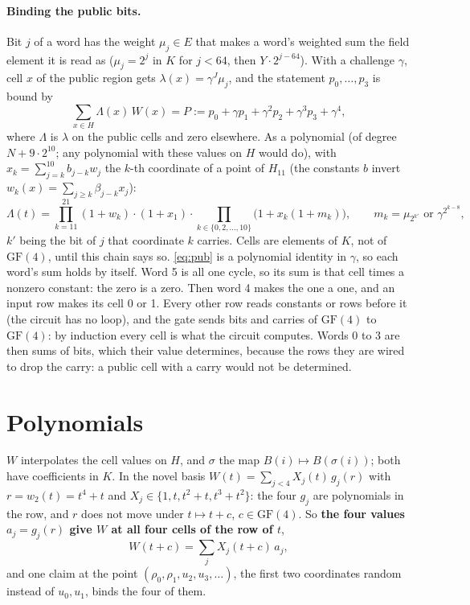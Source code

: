 \documentclass[11pt]{article}
\newcommand{\K}{K}
\newcommand{\E}{E}
\newcommand{\cells}{H}
\newcommand{\wit}{W}
\newcommand{\perm}{\sigma}
\newcommand{\pub}{\Lambda}
\newcommand{\target}{P}
\begin{document}
\paragraph{Binding the public bits.} Bit $j$ of a word has the weight $\mu_j \in \E$ that makes a word's weighted sum the field element it is read as ($\mu_j = 2^j$ in $\K$ for $j < 64$, then $Y \cdot 2^{j - 64}$). With a challenge $\gamma$, cell $x$ of the public region gets $\lambda(x) = \gamma^J \mu_j$, and the statement $p_0, \dots, p_3$ is bound by
\begin{equation}\label{eq:pub}
  \sum_{x \in \cells} \pub(x) \, \wit(x) = \target := p_0 + \gamma p_1 + \gamma^2 p_2 + \gamma^3 p_3 + \gamma^4 ,
\end{equation}
where $\pub$ is $\lambda$ on the public cells and zero elsewhere. As a polynomial (of degree $N + 9 \cdot 2^{10}$; any polynomial with these values on $\cells$ would do), with $x_k = \sum_{j = k}^{10} b_{j-k} w_j$ the $k$-th coordinate of a point of $H_{11}$ (the constants $b$ invert $w_k(x) = \sum_{j \ge k} \beta_{j-k} x_j$):
\[
  \pub(t) = \prod_{k=11}^{21} (1 + w_k) \cdot (1 + x_1) \cdot \prod_{k \in \{0, 2, \dots, 10\}} \bigl(1 + x_k (1 + m_k)\bigr), \qquad m_k = \mu_{2^{k'}} \text{ or } \gamma^{2^{k - 8}},
\]
$k'$ being the bit of $j$ that coordinate $k$ carries. Cells are elements of $\K$, not of $\mathrm{GF}(4)$, until this chain says so. \eqref{eq:pub} is a polynomial identity in $\gamma$, so each word's sum holds by itself. Word 5 is all one cycle, so its sum is that cell times a nonzero constant: the zero is a zero. Then word 4 makes the one a one, and an input row makes its cell 0 or 1. Every other row reads constants or rows before it (the circuit has no loop), and the gate sends bits and carries of $\mathrm{GF}(4)$ to $\mathrm{GF}(4)$: by induction every cell is what the circuit computes. Words 0 to 3 are then sums of bits, which their value determines, because the rows they are wired to drop the carry: a public cell with a carry would not be determined.

\section{Polynomials}

$\wit$ interpolates the cell values on $\cells$, and $\perm$ the map $B(i) \mapsto B(\perm(i))$; both have coefficients in $\K$. In the novel basis $\wit(t) = \sum_{j < 4} X_j(t) \, g_j(r)$ with $r = w_2(t) = t^4 + t$ and $X_j \in \{1, t, t^2 + t, t^3 + t^2\}$: the four $g_j$ are polynomials in the row, and $r$ does not move under $t \mapsto t + c$, $c \in \mathrm{GF}(4)$. So \textbf{the four values $a_j = g_j(r)$ give $\wit$ at all four cells of the row of $t$},
\begin{equation}\label{eq:cells}
  \wit(t + c) = \sum_j X_j(t + c) \, a_j ,
\end{equation}
and one claim at the point $(\rho_0, \rho_1, u_2, u_3, \dots)$, the first two coordinates random instead of $u_0, u_1$, binds the four of them.
\end{document}
